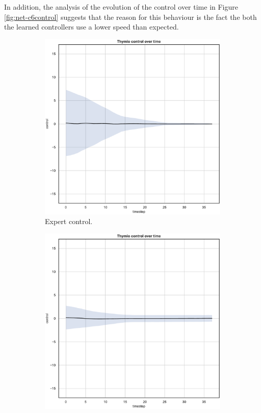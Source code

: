 In addition, the analysis of the evolution of the control over time in Figure 
\ref{fig:net-c6control} suggests that the reason for this behaviour is the fact the 
both the learned controllers use a lower speed than expected.
\begin{figure}[!htb]
	\begin{center}
		\begin{subfigure}[h]{0.35\textwidth}
			\includegraphics[width=\textwidth]{contents/images/net-d6/control-overtime-omniscient}%
			\caption{Expert control.}
		\end{subfigure}
		\hspace{1cm}
		\begin{subfigure}[h]{0.35\textwidth}
			\includegraphics[width=\textwidth]{contents/images/net-d6/control-overtime-learned_distributed}

\end{subfigure}
\end{center}
\end{figure}
